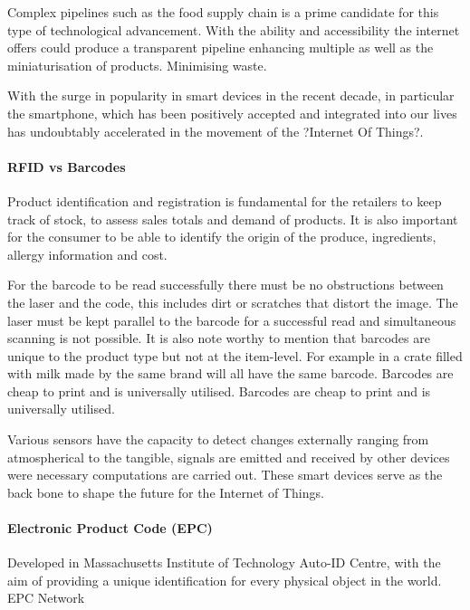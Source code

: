 \documentclass[a4paper, 11pt]{article}
\begin{document}
Complex pipelines such as the food supply chain is a prime candidate for this type of technological advancement. With the ability and accessibility the internet offers could produce a transparent pipeline enhancing multiple as well as the miniaturisation of products. Minimising waste.

With the surge in popularity in smart devices in the recent decade, in particular the smartphone, which has been positively accepted and integrated into our lives has undoubtably accelerated in the movement of the ?Internet Of Things?. 

\paragraph{RFID vs Barcodes}
Product identification and registration is fundamental for the retailers to keep track of stock, to assess sales totals and demand of products. It is also important for the consumer to be able to identify the origin of the produce, ingredients, allergy information and cost. 

For the barcode to be read successfully there must be no obstructions between the laser and the code, this includes dirt or scratches that distort the image. The laser must be kept parallel to the barcode for a successful read and simultaneous scanning is not possible. It is also note worthy to mention that barcodes are unique to the product type but not at the item-level. For example in a crate filled with milk made by the same brand will all have the same barcode. Barcodes are cheap to print and is universally utilised. Barcodes are cheap to print and is universally utilised.

Various sensors have the capacity to detect changes externally ranging from atmospherical to the tangible, signals are emitted and received by other devices were necessary computations are carried out. These smart devices serve as the back bone to shape the future for the Internet of Things.


\paragraph{Electronic Product Code (EPC)}
Developed in Massachusetts Institute of Technology Auto-ID Centre, with the aim of providing a unique identification for every physical object in the world. EPC Network


\vspace{\baselineskip}
\vspace{\baselineskip}
\vspace{\baselineskip}
\end{document}
